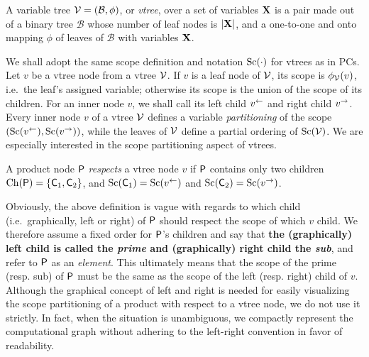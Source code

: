\begin{definition}[Vtree]
  A variable tree $\operatorname{\mathcal{V}}=(\mathcal{B},\phi)$, or \emph{vtree}, over a set of variables $\mathbf{X}$
  is a pair made out of a binary tree $\mathcal{B}$ whose number of leaf nodes is $|\mathbf{X}|$, and
  a one-to-one and onto mapping $\phi$ of leaves of $\mathcal{B}$ with variables $\mathbf{X}$.
\end{definition}

We shall adopt the same scope definition and notation $\operatorname*{\normalfont{Sc}}(\cdot)$ for vtrees as in PCs. Let $v$ be
a vtree node from a vtree $\operatorname{\mathcal{V}}$. If $v$ is a leaf node of $\operatorname{\mathcal{V}}$, its scope is
$\phi_{\operatorname{\mathcal{V}}}(v)$, i.e.\ the leaf's assigned variable; otherwise its scope is the union of the
scope of its children. For an inner node $v$, we shall call its left child $v^\gets$ and right
child $v^\to$. Every inner node $v$ of a vtree $\operatorname{\mathcal{V}}$ defines a variable \emph{partitioning} of
the scope $(\operatorname*{\normalfont{Sc}}(v^\gets), \operatorname*{\normalfont{Sc}}(v^\to))$, while the leaves of $\operatorname{\mathcal{V}}$ define a partial ordering of
$\operatorname*{\normalfont{Sc}}(\operatorname{\mathcal{V}})$. We are especially interested in the scope partitioning aspect of vtrees.

\begin{definition}
  A product node $\operatorname{\textup{\textsf{P}}}$ \emph{respects} a vtree node $v$ if $\operatorname{\textup{\textsf{P}}}$ contains only two children
  $\operatorname*{\normalfont{Ch}}(\operatorname{\textup{\textsf{P}}})=\{\operatorname{\textup{\textsf{C}}}_1,\operatorname{\textup{\textsf{C}}}_2\}$, and $\operatorname*{\normalfont{Sc}}(\operatorname{\textup{\textsf{C}}}_1)=\operatorname*{\normalfont{Sc}}(v^\gets)$ and $\operatorname*{\normalfont{Sc}}(\operatorname{\textup{\textsf{C}}}_2)=
  \operatorname*{\normalfont{Sc}}(v^\to)$.
\end{definition}

Obviously, the above definition is vague with regards to which child (i.e.\ graphically, left or
right) of $\operatorname{\textup{\textsf{P}}}$ should respect the scope of which $v$ child. We therefore assume a fixed order
for $\operatorname{\textup{\textsf{P}}}$'s children and say that \textbf{the (graphically) left child is called the \emph{prime}
and (graphically) right child the \emph{sub}}, and refer to $\operatorname{\textup{\textsf{P}}}$ as an \emph{element}. This
ultimately means that the scope of the prime (resp. sub) of $\operatorname{\textup{\textsf{P}}}$ must be the same as the scope
of the left (resp. right) child of $v$. Although the graphical concept of left and right is needed
for easily visualizing the scope partitioning of a product with respect to a vtree node, we do not
use it strictly. In fact, when the situation is unambiguous, we compactly represent the
computational graph without adhering to the left-right convention in favor of readability.


